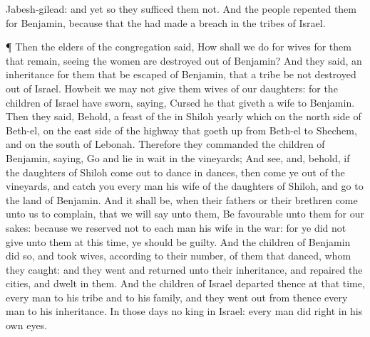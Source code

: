 {Jabesh-gilead: and yet so they
sufficed them not.
And the
people
repented them for
Benjamin, because that the
{} had
made a
breach in the
tribes of
Israel.
\par }{\PP {}¶ Then the
elders of the
congregation
said, How shall we
do for
wives for them that
remain, seeing the
women are
destroyed out of
Benjamin?
And they
said,
{} an
inheritance for them that be
escaped of
Benjamin, that a
tribe be not
destroyed out of
Israel.
Howbeit we
may not
give them
wives of our
daughters: for the
children of
Israel have
sworn,
saying,
Cursed
{} he that
giveth a
wife to
Benjamin.
Then they
said, Behold,
{} a
feast of the
{} in
Shiloh
yearly
{} which
{} on the north
side of
Beth-el, on the east
side of the
highway that goeth
up from
Beth-el to
Shechem, and on the
south of
Lebonah.
Therefore they
commanded the
children of
Benjamin,
saying,
Go and lie in
wait in the
vineyards;
And
see, and, behold, if the
daughters of
Shiloh come
out to
dance in
dances, then come ye
out of the
vineyards, and
catch you every
man his
wife of the
daughters of
Shiloh, and
go to the
land of
Benjamin.
And it shall be, when their
fathers or their
brethren
come unto us to
complain, that we will
say unto them, Be
favourable unto them for our sakes: because we
reserved not to each
man his
wife in the
war: for ye did not
give unto them at this
time,
{} ye should be
guilty.
And the
children of
Benjamin did
so, and
took
{}
wives, according to their
number, of them that
danced, whom they
caught: and they
went and
returned unto their
inheritance, and
repaired the
cities, and
dwelt in them.
And the
children of
Israel
departed thence at that
time, every
man to his
tribe and to his
family, and they went
out from thence every
man to his
inheritance.
In those
days
{} no
king in
Israel: every
man
did
{}
right in his own
eyes.
\par }